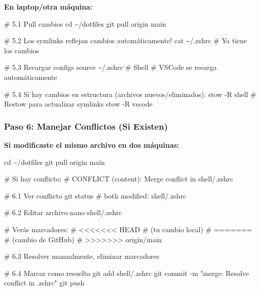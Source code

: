 \documentclass[
  doc,
  floatsintext,
  longtable,
  a4paper,
  nolmodern,
  notxfonts,
  notimes,
  12pt,
  colorlinks=true,linkcolor=blue,citecolor=blue,urlcolor=blue]{apa7}
\newenvironment{Shaded}{\begin{snugshade}}{\end{snugshade}}
\newcommand{\AttributeTok}[1]{\textcolor[rgb]{0.40,0.45,0.13}{#1}}
\newcommand{\BuiltInTok}[1]{\textcolor[rgb]{0.00,0.23,0.31}{#1}}
\newcommand{\CommentTok}[1]{\textcolor[rgb]{0.37,0.37,0.37}{#1}}
\newcommand{\ExtensionTok}[1]{\textcolor[rgb]{0.00,0.23,0.31}{#1}}
\newcommand{\FunctionTok}[1]{\textcolor[rgb]{0.28,0.35,0.67}{#1}}
\newcommand{\NormalTok}[1]{\textcolor[rgb]{0.00,0.23,0.31}{#1}}
\newcommand{\StringTok}[1]{\textcolor[rgb]{0.13,0.47,0.30}{#1}}
\begin{document}
\textbf{En laptop/otra máquina:}

\begin{Shaded}
\begin{Highlighting}[]
\CommentTok{\# 5.1 Pull cambios}
\BuiltInTok{cd}\NormalTok{ \textasciitilde{}/dotfiles}
\FunctionTok{git}\NormalTok{ pull origin main}

\CommentTok{\# 5.2 Los symlinks reflejan cambios automáticamente!}
\FunctionTok{cat}\NormalTok{ \textasciitilde{}/.zshrc  }\CommentTok{\# Ya tiene los cambios}

\CommentTok{\# 5.3 Recargar configs}
\BuiltInTok{source}\NormalTok{ \textasciitilde{}/.zshrc  }\CommentTok{\# Shell}
\CommentTok{\# VSCode se recarga automáticamente}

\CommentTok{\# 5.4 Si hay cambios en estructura (archivos nuevos/eliminados):}
\ExtensionTok{stow} \AttributeTok{{-}R}\NormalTok{ shell  }\CommentTok{\# Restow para actualizar symlinks}
\ExtensionTok{stow} \AttributeTok{{-}R}\NormalTok{ vscode}
\end{Highlighting}
\end{Shaded}

\subsubsection{Paso 6: Manejar Conflictos (Si
Existen)}\label{paso-6-manejar-conflictos-si-existen}

\textbf{Si modificaste el mismo archivo en dos máquinas:}

\begin{Shaded}
\begin{Highlighting}[]
\BuiltInTok{cd}\NormalTok{ \textasciitilde{}/dotfiles}
\FunctionTok{git}\NormalTok{ pull origin main}

\CommentTok{\# Si hay conflicto:}
\CommentTok{\# CONFLICT (content): Merge conflict in shell/.zshrc}

\CommentTok{\# 6.1 Ver conflicto}
\FunctionTok{git}\NormalTok{ status}
\CommentTok{\# both modified:   shell/.zshrc}

\CommentTok{\# 6.2 Editar archivo}
\FunctionTok{nano}\NormalTok{ shell/.zshrc}

\CommentTok{\# Verás marcadores:}
\CommentTok{\# \textless{}\textless{}\textless{}\textless{}\textless{}\textless{}\textless{} HEAD}
\CommentTok{\# (tu cambio local)}
\CommentTok{\# =======}
\CommentTok{\# (cambio de GitHub)}
\CommentTok{\# \textgreater{}\textgreater{}\textgreater{}\textgreater{}\textgreater{}\textgreater{}\textgreater{} origin/main}

\CommentTok{\# 6.3 Resolver manualmente, eliminar marcadores}

\CommentTok{\# 6.4 Marcar como resuelto}
\FunctionTok{git}\NormalTok{ add shell/.zshrc}
\FunctionTok{git}\NormalTok{ commit }\AttributeTok{{-}m} \StringTok{"merge: Resolve conflict in .zshrc"}
\FunctionTok{git}\NormalTok{ push}
\end{Highlighting}
\end{Shaded}
\end{document}
